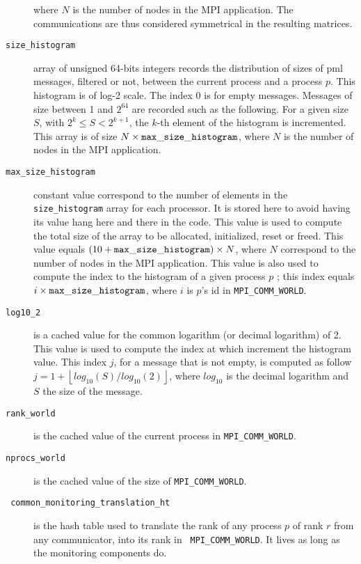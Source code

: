 \documentclass[notitlepage]{article}
\newcommand{\brkunds}[0]{\allowbreak\_}
\begin{document}
\begin{description}
  where $N$ is the number of nodes in the MPI application. The
  communications are thus considered symmetrical in the resulting
  matrices.
\item[{\tt size\brkunds{}histogram}] array of unsigned 64-bits
  integers records the distribution of sizes of pml messages, filtered
  or not, between the current process and a process $p$. This
  histogram is of log-2 scale. The index 0 is for empty
  messages. Messages of size between 1 and $2^{64}$ are recorded such
  as the following. For a given size $S$, with $2^k \le S < 2^{k+1}$,
  the $k$-th element of the histogram is incremented. This array is of
  size $N \times {\tt max\brkunds{}size\brkunds{}histogram}$, where
  $N$ is the number of nodes in the MPI application.
\item[{\tt max\brkunds{}size\brkunds{}histogram}] constant value
  correspond to the number of elements in the {\tt
    size\brkunds{}histo\allowbreak{}gram} array for each processor. It
  is stored here to avoid having its value hang here and there in the
  code. This value is used to compute the total size of the array to
  be allocated, initialized, reset or freed. This value equals $(10 +
  {\tt max\brkunds{}size\brkunds{}histogram}) \times N$, where $N$
  correspond to the number of nodes in the MPI application. This value
  is also used to compute the index to the histogram of a given
  process $p$ ; this index equals $i \times {\tt
    max\brkunds{}size\brkunds{}histogram}$, where $i$ is $p$'s id in
  {\tt MPI\brkunds{}COMM\brkunds{}WORLD}.
\item[{\tt log10\brkunds{}2}] is a cached value for the common
  logarithm (or decimal logarithm) of 2. This value is used to compute
  the index at which increment the histogram value. This index $j$,
  for a message that is not empty, is computed as follow $j = 1 +
  \left \lfloor{log_{10}(S)/log_{10}(2)} \right \rfloor$, where
  $log_{10}$ is the decimal logarithm and $S$ the size of the message.
\item[{\tt rank\brkunds{}world}] is the cached value of the current
  process in {\tt MPI\brkunds{}COMM\brkunds{}WORLD}.
\item[{\tt nprocs\brkunds{}world}] is the cached value of the size of
  {\tt MPI\brkunds{}COMM\brkunds{}WORLD}.
\item[{\tt
    common\brkunds{}monitoring\brkunds{}translation\brkunds{}ht}] is
  the hash table used to translate the rank of any process $p$ of rank
  $r$ from any communicator, into its rank in {\tt
    MPI\brkunds{}COMM\brkunds{}WORLD}. It lives as long as the
  monitoring components do.
\end{description}
\end{document}

